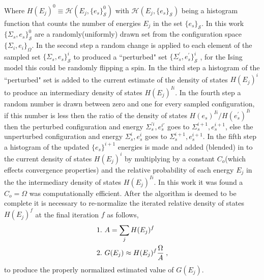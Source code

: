 \documentclass[twocolumn]{article}
\begin{document}
Where  $H(E_j)^0 \equiv \mathcal{H}(E_j,\{e_s\}_{\mathcal{S}}^0)$ with $\mathcal{H}(E_j,\{e_s\}_{\mathcal{S}})$ being a histogram function that counts the number of energies $E_j$ in the set $\{e_s\}_{\mathcal{S}}$. In this work $\{\Sigma_{s},e_s\}_{\mathcal{S}}^0$  are a randomly(uniformly) drawn set from the configuration space $\{ \Sigma_i, e_i \}_\Omega $. In the second step  a random change is applied to each element of the sampled set $\{\Sigma_{s},e_s\}_{\mathcal{S}}^i$ to produced a ``perturbed" set $ \{\Sigma_{s}^{'},e_s^{'}\}_{\mathcal{S}}^i$ , for the Ising model this could be randomly flipping a spin. In the third step a histogram of the ``perturbed" set is added to the current estimate of the density of states $H(E_j)^i$ to produce an intermediary density of states $H(E_j)^{Ii}$. In the fourth step a random number is drawn between zero and one for every sampled configuration, if this number is less then the ratio of the density of states $H(e_s)^{Ii}/H(e_s^{'})^{Ii}$ then the perturbed configuration and energy  $\Sigma_{s}^{'i},e_s^{i'}$  goes to $\Sigma_{s}^{i+1},e_s^{i+1}$,  else the unperturbed configuration and energy $\Sigma_{s}^{i},e_s^i$  goes to $\Sigma_{s}^{i+1},e_s^{i+1}$. In the fifth step a histogram of the updated $\{ e_s \}^{i+1}$ energies is made and added (blended) in to the current density of states $H(E_j)^i$   by multiplying  by a constant $C_{o}$(which effects convergence properties) and the relative probability of each energy $E_j$ in the the intermediary density of states $H(E_j)^{Ii}$. In this work it was found a $C_{o}=\Omega$ was computationally efficient. After the algorithm is deemed to be complete it is necessary to re-normalize the iterated relative density of states $H(E_j)^f$ at the final iteration $f$ as follows, 
\begin{equation}
\begin{split}
&1. \hspace{0.125cm} A = \sum_jH(E_j)^f\\
&2. \hspace{0.125cm} G(E_j)\approx H(E_j)^f \frac{\Omega}{A} \;,
\end{split}
\end{equation}
to produce the properly normalized estimated value of $G(E_j)$. 
\end{document}
